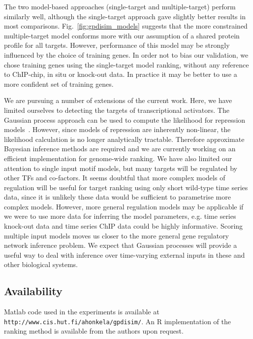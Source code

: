 \documentclass{pnastwo}
\begin{document}
\begin{article}
The two model-based approaches (single-target and multiple-target) perform 
similarly well, although the single-target approach gave slightly better results in 
most comparisons. Fig.~\ref{fig:gpdisim_models} suggests that the more constrained 
multiple-target model conforms more with our assumption of a shared protein 
profile for all targets. However, performance of this model may be strongly
influenced by the choice of training genes. In order not to bias our validation, 
we chose training genes using the single-target model ranking, without any reference
to ChIP-chip, in situ or knock-out data. In practice it may be better to use a more 
confident set of training genes. 

We are pursuing a number of extensions of the current work. Here, we
have limited ourselves to detecting the targets of transcriptional activators. The
Gaussian process approach can be used to compute the likelihood for
repression models~\cite{Gao2008}. However, since models of repression
are inherently non-linear, the likelihood calculation is no longer analytically
tractable. Therefore approximate Bayesian inference methods are
required and we are currently working on an efficient implementation
for genome-wide ranking. We have also limited our attention
to single input motif models, but many targets will be regulated by other TFs and
co-factors. It seems doubtful that more complex models of regulation
will be useful for target ranking using only short wild-type time
series data, since it is unlikely these data would be sufficient to parametrise more complex models. However,
more general regulation models may be applicable if we were to use more data for
inferring the model parameters, e.g. time series knock-out data and time series
ChIP data could be highly informative. Scoring multiple input
models moves us closer to the more general gene regulatory network inference
problem. We expect that Gaussian processes will provide a useful way
to deal with inference over time-varying external inputs in these and other
biological systems.

\subsection{Availability}
Matlab code used in the experiments is available at
\texttt{http://www.cis.hut.fi/ahonkela/gpdisim/}.  An R implementation of
the ranking method is available from the authors upon request.

\begin{materials}

\end{materials}
\end{article}
\end{document}
